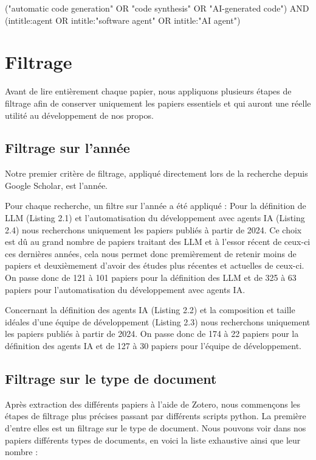 \begin{codeC}
    ("automatic code generation" OR "code synthesis" OR "AI-generated code") AND (intitle:agent OR intitle:"software agent" OR intitle:"AI agent")
\end{codeC}

\section{Filtrage}

Avant de lire entièrement chaque papier, nous appliquons plusieurs étapes de filtrage afin de conserver uniquement les papiers essentiels et qui auront une réelle utilité au développement de nos propos.

\subsection{Filtrage sur l'année}
Notre premier critère de filtrage, appliqué directement lors de la recherche depuis Google Scholar, est l'année.

Pour chaque recherche, un filtre sur l'année a été appliqué :
Pour la définition de LLM  (Listing 2.1) et l'automatisation du développement avec agents IA (Listing 2.4) nous recherchons uniquement les papiers publiés à partir de 2024. Ce choix est dû au grand nombre de papiers traitant des LLM et à l'essor récent de ceux-ci ces dernières années, cela nous permet donc premièrement de retenir moins de papiers et deuxièmement d'avoir des études plus récentes et actuelles de ceux-ci. On passe donc de 121 à 101 papiers pour la définition des LLM et de 325 à 63 papiers pour l'automatisation du développement avec agents IA.

Concernant la définition des agents IA (Listing 2.2) et la composition et taille idéales d'une équipe de développement (Listing 2.3) nous recherchons uniquement les papiers publiés à partir de 2024. On passe donc de 174 à 22 papiers pour la définition des agents IA et de 127 à 30 papiers pour l'équipe de développement.

\subsection{Filtrage sur le type de document}

Après extraction des différents papiers à l'aide de Zotero, nous commençons les étapes de filtrage plus précises passant par différents scripts python. La première d'entre elles est un filtrage sur le type de document.
Nous pouvons voir dans nos papiers différents types de documents, en voici la liste exhaustive ainsi que leur nombre :

